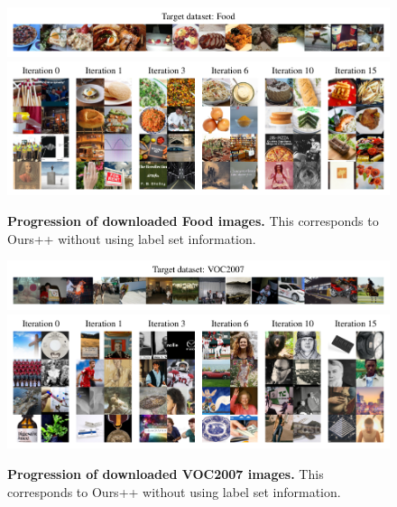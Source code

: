 \begin{figure}
    \centering
    \includegraphics{figures/food_targets.pdf} \\
    \vspace{-0.8em}
    \includegraphics{figures/food-progression-1148-2col.pdf}
    \caption{\textbf{Progression of downloaded Food images.} This corresponds to Ours++ without using label set information. }
    \label{fig:food_progression}
\end{figure}

\begin{figure}
    \centering
    \includegraphics{figures/voc_targets.pdf} \\
    \vspace{-0.8em}
    \includegraphics{figures/voc-progression-1156-2col.pdf}
    \caption{\textbf{Progression of downloaded VOC2007 images.} This corresponds to Ours++ without using label set information. }
    \label{fig:voc_progression}
\end{figure}



